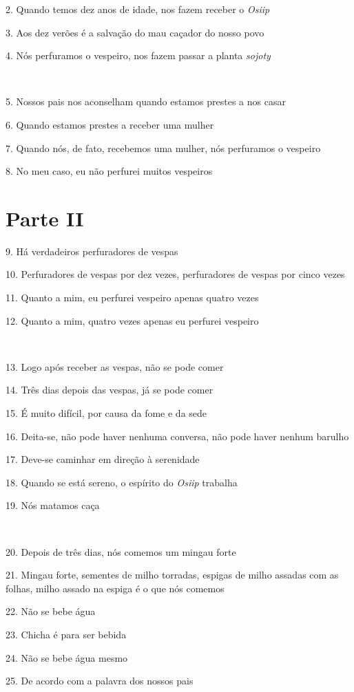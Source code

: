 2. Quando temos dez anos de idade, nos fazem receber o \emph{Osiip}

3. Aos dez verões é a salvação do mau caçador do nosso povo

4. Nós perfuramos o vespeiro, nos fazem passar a planta \emph{sojoty}

~

5. Nossos pais nos aconselham quando estamos prestes a nos casar

6. Quando estamos prestes a receber uma mulher

7. Quando nós, de fato, recebemos uma mulher, nós perfuramos o vespeiro

8. No meu caso, eu não perfurei muitos vespeiros

\section{Parte II}

9. Há verdadeiros perfuradores de vespas

10. Perfuradores de vespas por dez vezes, perfuradores de vespas por cinco vezes

11. Quanto a mim, eu perfurei vespeiro apenas quatro vezes

12. Quanto a mim, quatro vezes apenas eu perfurei vespeiro

~

13. Logo após receber as vespas, não se pode comer

14. Três dias depois das vespas, já se pode comer

15. É muito difícil, por causa da fome e da sede

16. Deita-se, não pode haver nenhuma conversa, não pode haver nenhum
barulho

17. Deve-se caminhar em direção à serenidade

18. Quando se está sereno, o espírito do \emph{Osiip} trabalha

19. Nós matamos caça

~

20. Depois de três dias, nós comemos um mingau forte

21. Mingau forte, sementes de milho torradas, espigas de milho assadas
com as folhas, milho assado na espiga é o que nós comemos

22. Não se bebe água

23. Chicha é para ser bebida

24. Não se bebe água mesmo

25. De acordo com a palavra dos nossos pais


